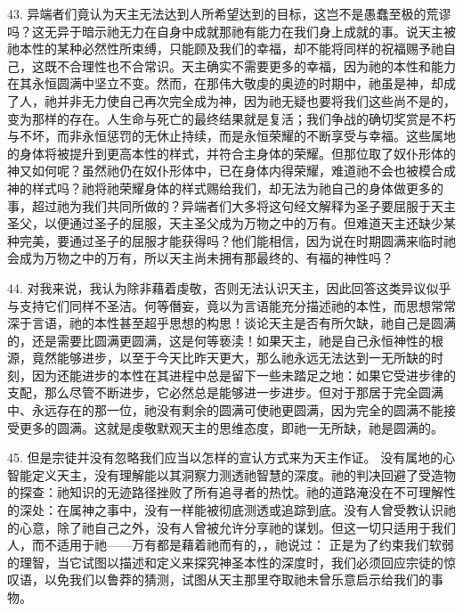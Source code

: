 43. 异端者们竟认为天主无法达到人所希望达到的目标，这岂不是愚蠢至极的荒谬吗？这无异于暗示祂无力在自身中成就那祂有能力在我们身上成就的事。说天主被祂本性的某种必然性所束缚，只能顾及我们的幸福，却不能将同样的祝福赐予祂自己，这既不合理性也不合常识。天主确实不需要更多的幸福，因为祂的本性和能力在其永恒圆满中坚立不变。然而，在那伟大敬虔的奥迹的时期中，祂虽是神，却成了人，祂并非无力使自己再次完全成为神，因为祂无疑也要将我们这些尚不是的，变为那样的存在。人生命与死亡的最终结果就是复活；我们争战的确切奖赏是不朽与不坏，而非永恒惩罚的无休止持续，而是永恒荣耀的不断享受与幸福。这些属地的身体将被提升到更高本性的样式，并符合主身体的荣耀。但那位取了奴仆形体的神又如何呢？虽然祂仍在奴仆形体中，已在身体内得荣耀，难道祂不会也被模合成神的样式吗？祂将祂荣耀身体的样式赐给我们，却无法为祂自己的身体做更多的事，超过祂为我们共同所做的？异端者们大多将这句经文解释为圣子要屈服于天主圣父，以便通过圣子的屈服，天主圣父成为万物之中的万有。但难道天主还缺少某种完美，要通过圣子的屈服才能获得吗？他们能相信，因为说在时期圆满来临时祂会成为万物之中的万有，所以天主尚未拥有那最终的、有福的神性吗？\par

44. 对我来说，我认为除非藉着虔敬，否则无法认识天主，因此回答这类异议似乎与支持它们同样不圣洁。何等僭妄，竟以为言语能充分描述祂的本性，而思想常常深于言语，祂的本性甚至超乎思想的构思！谈论天主是否有所欠缺，祂自己是圆满的，还是需要比圆满更圆满，这是何等亵渎！如果天主，祂是自己永恒神性的根源，竟然能够进步，以至于今天比昨天更大，那么祂永远无法达到一无所缺的时刻，因为还能进步的本性在其进程中总是留下一些未踏足之地：如果它受进步律的支配，那么尽管不断进步，它必然总是能够进一步进步。但对于那居于完全圆满中、永远存在的那一位，祂没有剩余的圆满可使祂更圆满，因为完全的圆满不能接受更多的圆满。这就是虔敬默观天主的思维态度，即祂一无所缺，祂是圆满的。\par

45. 但是宗徒并没有忽略我们应当以怎样的宣认方式来为天主作证。 没有属地的心智能定义天主，没有理解能以其洞察力测透祂智慧的深度。祂的判决回避了受造物的探查：祂知识的无迹路径挫败了所有追寻者的热忱。祂的道路淹没在不可理解性的深处：在属神之事中，没有一样能被彻底测透或追踪到底。没有人曾受教认识祂的心意，除了祂自己之外，没有人曾被允许分享祂的谋划。但这一切只适用于我们人，而不适用于祂——万有都是藉着祂而有的，，祂说过： 正是为了约束我们软弱的理智，当它试图以描述和定义来探究神圣本性的深度时，我们必须回应宗徒的惊叹语，以免我们以鲁莽的猜测，试图从天主那里夺取祂未曾乐意启示给我们的事物。\par

